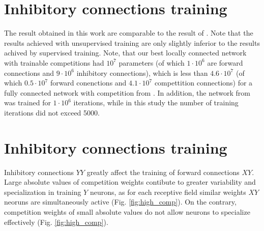 \documentclass[a4paper,10pt]{article}
\begin{document}
\pagebreak

\section{Inhibitory connections training}
\label{section:competition-training}
The result obtained in this work are comparable to the result of \cite{saunders2019locally}. Note that the results achieved with unsupervised training are only slightly inferior to the results achived by supervised training. Note, that our best locally connected network with trainable competitions had $ 10^7 $ parameters (of which $ 1 \cdot 10^6 $ are forward connections and $ 9 \cdot 10^6 $ inhibitory connections), which is less than $ 4.6 \cdot 10^7 $ (of which $ 0.5 \cdot 10^7 $ forward conenctions and $ 4.1 \cdot 10^7 $ compettition connections) for a fully connected network with competition from \cite{mnist2}. In addition, the network from \cite{mnist2} was trained for $ 1 \cdot 10^6 $ iterations, while in this study the number of training iterations did not exceed 5000. 

\section {Inhibitory connections training}
Inhibitory connections $YY$ greatly affect the training of forward connections $XY$. Large absolute values of competition weights contibute to greater variability and specialization in training $Y$ neurons, as for each receptive field similar weights $XY$ neoruns are simultaneously active (Fig. \ref{fig:high_comp}). On the contrary, competition weights of small absolute values do not allow neurons to specialize effectively (Fig. \ref{fig:high_comp}). 
\end{document}

